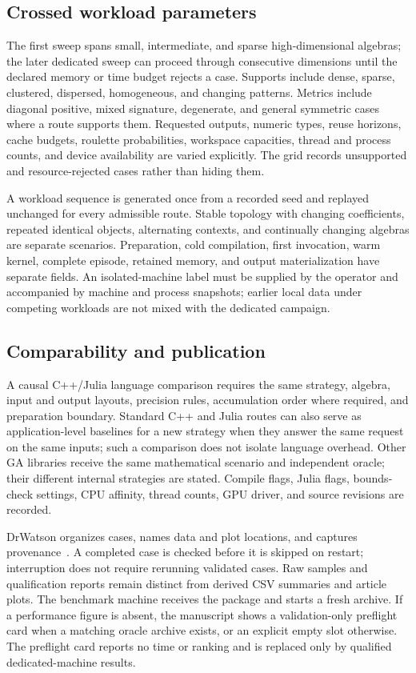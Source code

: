 \documentclass[11pt,a4paper]{article}
\begin{document}
\subsection{Crossed workload parameters}
The first sweep spans small, intermediate, and sparse
high-dimensional algebras; the later dedicated sweep can proceed
through consecutive dimensions until the declared memory or time
budget rejects a case. Supports include dense, sparse, clustered,
dispersed, homogeneous, and changing patterns. Metrics include
diagonal positive, mixed signature, degenerate, and general
symmetric cases where a route supports them. Requested outputs,
numeric types, reuse horizons, cache budgets, roulette
probabilities, workspace capacities, thread and process counts,
and device availability are varied explicitly. The grid records
unsupported and resource-rejected cases rather than hiding them.

A workload sequence is generated once from a recorded seed and
replayed unchanged for every admissible route. Stable topology
with changing coefficients, repeated identical objects, alternating
contexts, and continually changing algebras are separate
scenarios. Preparation, cold compilation, first invocation, warm
kernel, complete episode, retained memory, and output
materialization have separate fields. An isolated-machine label
must be supplied by the operator and accompanied by machine and
process snapshots; earlier local data under competing workloads
are not mixed with the dedicated campaign.

\subsection{Comparability and publication}
A causal C++/Julia language comparison requires the same strategy,
algebra, input and output layouts, precision rules, accumulation order
where required, and preparation boundary. Standard C++ and Julia routes
can also serve as application-level baselines for a new strategy when
they answer the same request on the same inputs; such a comparison does
not isolate language overhead. Other GA
libraries receive the same mathematical scenario and independent
oracle; their different internal strategies are stated.
Compile flags, Julia flags, bounds-check settings, CPU affinity,
thread counts, GPU driver, and source revisions are recorded.

DrWatson organizes cases, names data and plot locations, and
captures provenance~\cite{drwatson}. A completed case is checked
before it is skipped on restart; interruption does not require
rerunning validated cases. Raw samples and qualification reports
remain distinct from derived CSV summaries and article plots.
The benchmark machine receives the package and starts a fresh
archive. If a performance figure is absent, the manuscript shows a
validation-only preflight card when a matching oracle archive exists,
or an explicit empty slot otherwise. The preflight card reports no time
or ranking and is replaced only by qualified dedicated-machine results.
\end{document}
